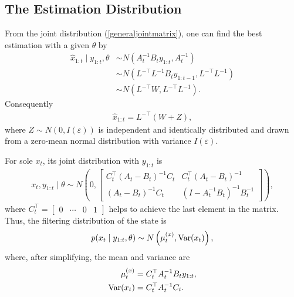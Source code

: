 \subsection{The Estimation Distribution}\label{generalEstDistr}

From the joint distribution (\ref{generaljointmatrix}), one can find the best estimation with a given $\theta$ by
\begin{align*}
\hat{x}_{1:t} \mid y_{1:t},\theta &\sim N \left( A_{t}^{-1}B_{t}y_{1:t}, A_{t}^{-1} \right) \\
&\sim N(L^{-\top}L^{-1}B_{t}y_{1:t-1},L^{-\top}L^{-1})\\
&\sim N(L^{-\top}W,L^{-\top}L^{-1}).
\end{align*}
Consequently 
\begin{align*}
\hat{x}_{1:t} = L^{-\top}(W+Z),
\end{align*}
where $Z \sim N(0, I(\varepsilon))$ is independent and identically distributed and drawn from a zero-mean normal distribution with variance $ I(\varepsilon)$. 

For sole $x_{t}$, its joint distribution with $y_{1:t}$ is 
\begin{align*}
x_{t}, y_{1:t}\mid \theta \sim N\left( 0, \begin{bmatrix}
C_{t}^\top(A_{t}-B_{t}) ^{-1}C_{t} & C_{t}^\top (A_{t}-B_{t})^{-1}\\
(A_{t}-B_{t})^{-1}C_{t} & (I- A_{t}^{-1}B_{t}) ^{-1}B_{t}^{-1}
\end{bmatrix} \right),
\end{align*}
where $C_t^\top = \begin{bmatrix}0 & \cdots & 0 & 1\end{bmatrix}$ helps to  achieve the last element in the matrix. Thus, the filtering distribution of the state is 
\begin{align*}
p(x_{t}\mid y_{1:t},\theta) \sim N\left( \mu_{t}^{(x)},\mathrm{Var}(x_{t}) \right),
\end{align*}
where, after simplifying, the mean and variance are  
\begin{align}\label{generalmux}
\mu_{t}^{(x)} & = C_{t}^\top A_{t}^{-1}B_{t}y_{1:t} ,\\
\mathrm{Var}(x_{t})& =C_{t}^\top A_{t}^{-1}C_{t}. \label{generalSigx}
\end{align}


